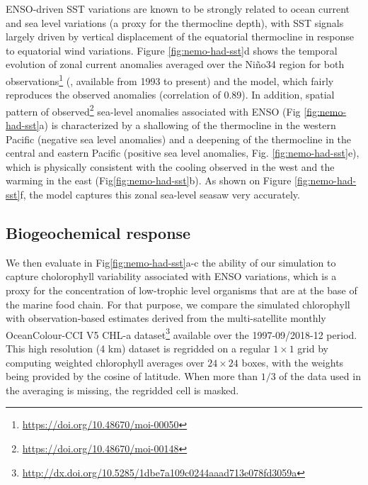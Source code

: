 ENSO-driven SST variations are known to be strongly related to ocean current and sea level variations (a proxy for the thermocline depth), with SST signals largely driven by vertical displacement of the equatorial thermocline in response to equatorial wind variations. Figure \ref{fig:nemo-had-sst}d shows the temporal evolution of zonal current anomalies averaged over the Niño34 region for both observations\footnote{\url{https://doi.org/10.48670/moi-00050}} (\citealp{rioGOCEOceanCirculation2014}, available from 1993 to present) and the model, which fairly reproduces the observed anomalies (correlation of 0.89).
In addition, spatial pattern of observed\footnote{\url{https://doi.org/10.48670/moi-00148}} sea-level anomalies associated with ENSO (Fig \ref{fig:nemo-had-sst}a) is characterized by a shallowing of the thermocline  in the western Pacific (negative sea level anomalies) and a deepening of the thermocline  in the central and eastern Pacific (positive sea level anomalies, Fig. \ref{fig:nemo-had-sst}e), which is physically consistent with the cooling observed in the west and the warming in the east (Fig\ref{fig:nemo-had-sst}b). As shown on Figure \ref{fig:nemo-had-sst}f, the model captures this zonal sea-level seasaw very accurately.

\subsection{Biogeochemical response}

We then evaluate in Fig\ref{fig:nemo-had-sst}a-c the ability of our simulation to capture cholorophyll variability associated with ENSO variations, which is a proxy for the concentration of low-trophic level organisms that are at the base of the marine food chain. For that purpose, we compare the simulated chlorophyll with observation-based estimates derived from the multi-satellite monthly OceanColour-CCI V5 CHL-a dataset\footnote{\url{http://dx.doi.org/10.5285/1dbe7a109c0244aaad713e078fd3059a}} \citep{sathyendranathOceanColourTimeSeries2019} available over the 1997-09/2018-12 period. This high resolution (4 km)  dataset is regridded on a regular $1\times 1$ grid by computing weighted chlorophyll averages over $24\times24$ boxes, with the weights being provided by the cosine of latitude. When more than $1/3$ of the data used in the averaging is missing, the regridded cell is masked.

